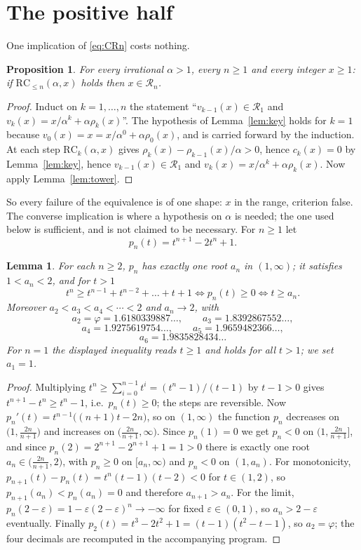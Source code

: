 \documentclass[11pt]{amsart}
\newtheorem{lemma}[theorem]{Lemma}
\newtheorem{proposition}[theorem]{Proposition}
\theoremstyle{remark}
\newcommand{\RC}{\mathrm{RC}}
\begin{document}
\section{The positive half}\label{sec:A}

One implication of \eqref{eq:CRn} costs nothing.

\begin{proposition}\label{prop:free}
For every irrational $\alpha>1$, every $n\ge1$ and every integer $x\ge1$:
if $\RC_{\le n}(\alpha,x)$ holds then $x\in\mathcal R_n$.
\end{proposition}

\begin{proof}
Induct on $k=1,\dots,n$ the statement ``$v_{k-1}(x)\in\mathcal R_1$ and
$v_k(x)=x/\alpha^{k}+\alpha\rho_k(x)$''. The hypothesis of Lemma~\ref{lem:key} holds for
$k=1$ because $v_0(x)=x=x/\alpha^{0}+\alpha\rho_0(x)$, and is carried forward by the
induction. At each step $\RC_k(\alpha,x)$ gives
$\rho_k(x)-\rho_{k-1}(x)/\alpha>0$, hence $c_k(x)=0$ by Lemma~\ref{lem:key}, hence
$v_{k-1}(x)\in\mathcal R_1$ and $v_k(x)=x/\alpha^{k}+\alpha\rho_k(x)$. Now apply
Lemma~\ref{lem:tower}.
\end{proof}

So every failure of the equivalence is of one shape: $x$ in the range, criterion false.
The converse implication is where a hypothesis on $\alpha$ is needed; the one used below
is sufficient, and is not claimed to be necessary. For $n\ge1$ let
\[
 p_n(t)=t^{n+1}-2t^{n}+1 .
\]

\begin{lemma}\label{lem:an}
For each $n\ge2$, $p_n$ has exactly one root $a_n$ in $(1,\infty)$; it satisfies
$1<a_n<2$, and for $t>1$
\[
 t^{n}\ge t^{n-1}+t^{n-2}+\dots+t+1
 \iff p_n(t)\ge0
 \iff t\ge a_n .
\]
Moreover $a_2<a_3<a_4<\cdots<2$ and $a_n\to2$, with
\[
 a_2=\varphi=1.6180339887\ldots,\qquad a_3=1.8392867552\ldots,
\]
\[
 a_4=1.9275619754\ldots,\qquad a_5=1.9659482366\ldots,
\]
\[
 a_6=1.9835828434\ldots
\]
For $n=1$ the displayed inequality reads $t\ge1$ and holds for all $t>1$; we set
$a_1=1$.
\end{lemma}

\begin{proof}
Multiplying $t^{n}\ge\sum_{i=0}^{n-1}t^{i}=(t^{n}-1)/(t-1)$ by $t-1>0$ gives
$t^{n+1}-t^{n}\ge t^{n}-1$, i.e.\ $p_n(t)\ge0$; the steps are reversible. Now
$p_n'(t)=t^{n-1}\bigl((n+1)t-2n\bigr)$, so on $(1,\infty)$ the function $p_n$ decreases
on $\bigl(1,\tfrac{2n}{n+1}\bigr)$ and increases on $\bigl(\tfrac{2n}{n+1},\infty\bigr)$.
Since $p_n(1)=0$ we get $p_n<0$ on $\bigl(1,\tfrac{2n}{n+1}\bigr]$, and since
$p_n(2)=2^{n+1}-2^{n+1}+1=1>0$ there is exactly one root $a_n\in\bigl(\tfrac{2n}{n+1},2\bigr)$,
with $p_n\ge0$ on $[a_n,\infty)$ and $p_n<0$ on $(1,a_n)$. For monotonicity,
$p_{n+1}(t)-p_n(t)=t^{n}(t-1)(t-2)<0$ for $t\in(1,2)$, so $p_{n+1}(a_n)<p_n(a_n)=0$ and
therefore $a_{n+1}>a_n$. For the limit, $p_n(2-\varepsilon)=1-\varepsilon(2-\varepsilon)^{n}\to-\infty$
for fixed $\varepsilon\in(0,1)$, so $a_n>2-\varepsilon$ eventually. Finally
$p_2(t)=t^{3}-2t^{2}+1=(t-1)(t^{2}-t-1)$, so $a_2=\varphi$; the four decimals are
recomputed in the accompanying program.
\end{proof}
\end{document}
